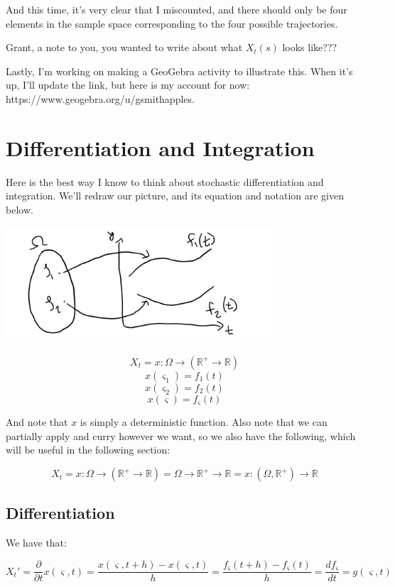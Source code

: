 \documentclass{article}
\begin{document}
And this time, it's very clear that I miscounted, and there should only be four elements in the sample space corresponding to the four possible trajectories.

Grant, a note to you, you wanted to write about what $X_t(s)$ looks like???

Lastly, I'm working on making a GeoGebra activity to illustrate this. When it's up, I'll update the link, but here is my account for now: https://www.geogebra.org/u/gsmithapples.

\section{Differentiation and Integration}
Here is the best way I know to think about stochastic differentiation and integration. We'll redraw our picture, and its equation and notation are given below.

\includegraphics[width=4in]{stochastic_ image.png}
\centering

$$X_t = x : \Omega \rightarrow \left(\mathbb{R}^+ \rightarrow  \mathbb{R} \right)$$ 
$$x(\varsigma_1) = f_1(t)$$
$$x(\varsigma_2) = f_2(t)$$
$$x(\varsigma) = f_\varsigma(t)$$

And note that $x$ is simply a deterministic function.  Also note that we can partially apply and curry however we want, so we also have the following, which will be useful in the following section:

$$X_t = x : \Omega \rightarrow \left(\mathbb{R}^+ \rightarrow  \mathbb{R} \right) = \Omega \rightarrow \mathbb{R}^+ \rightarrow  \mathbb{R} = x :  \left(\Omega  , \mathbb{R}^+\right)\rightarrow  \mathbb{R}$$ 

\subsection{Differentiation}
We have that:

$$X_t' = \frac{\partial}{\partial t}x(\varsigma,t)= \frac{x\left(\varsigma, t + h\right) - x\left(\varsigma, t\right)}{h} = \frac{f_\varsigma\left(t + h\right) - f_\varsigma\left(t\right)}{h} = \frac{df_\varsigma}{dt} =g\left(\varsigma, t\right)$$
\end{document}
